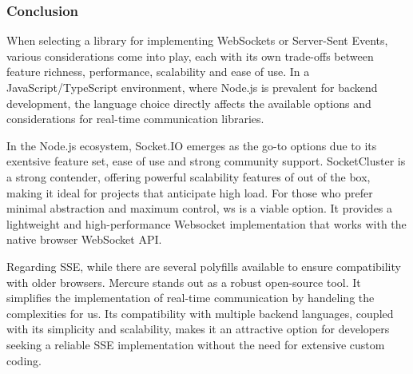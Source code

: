\subsubsection{Conclusion}

When selecting a library for implementing WebSockets or Server-Sent Events, various considerations come into play, each with its own trade-offs between feature richness, performance, scalability and ease of use. In a JavaScript/TypeScript environment, where Node.js is prevalent for backend development, the language choice directly affects the available options and considerations for real-time communication libraries.

In the Node.js ecosystem, Socket.IO emerges as the go-to options due to its exentsive feature set, ease of use and strong community support. SocketCluster is a strong contender, offering powerful scalability features of out of the box, making it ideal for projects that anticipate high load. For those who prefer minimal abstraction and maximum control, ws is a viable option. It provides a lightweight and high-performance Websocket implementation that works with the native browser WebSocket API.

Regarding SSE, while there are several polyfills available to ensure compatibility with older browsers. Mercure stands out as a robust open-source tool. It simplifies the implementation of real-time communication by handeling the complexities for us. Its compatibility with multiple backend languages, coupled with its simplicity and scalability, makes it an attractive option for developers seeking a reliable SSE implementation without the need for extensive custom coding.
